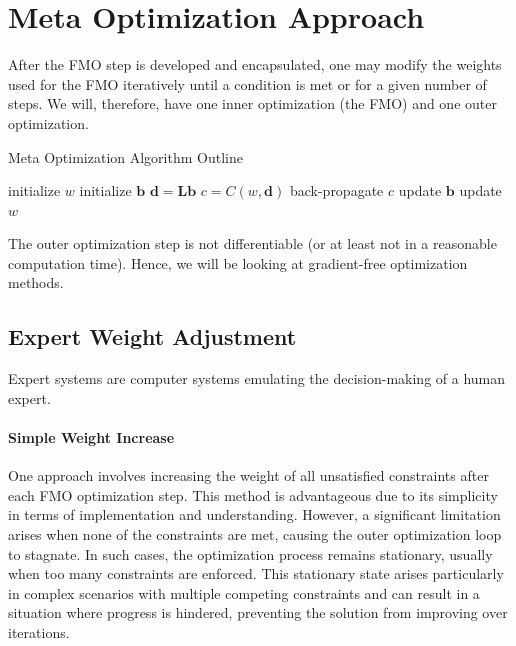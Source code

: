 \section{Meta Optimization Approach}
After the FMO step is developed and encapsulated, one may modify the weights used for the FMO iteratively until a condition is met or for a given number of steps.
We will, therefore, have one inner optimization (the FMO) and one outer optimization.
\begin{center}
	\begin{minipage}{.55\linewidth}
		\begin{algorithm}[H]
			\caption{Meta Optimization Algorithm Outline}
			\label{alg:meta_optim}
			\begin{algorithmic}
				\State initialize $w$
				\Repeat
					\State initialize $\mathbf{b}$ 
					\Repeat
						\State \textcolor{Prune}{ $\mathbf{d} = \textbf{L}\mathbf{b}$  }
						\State \textcolor{Prune}{ $c = C(w, \mathbf{d})$  }
						\State \textcolor{Prune}{ back-propagate $c$ }
						\State \textcolor{Prune}{ update $\mathbf{b}$ }
					 
					\State update $w$
			\end{algorithmic}
		\end{algorithm}
	\end{minipage}
\end{center}
The outer optimization step is not differentiable (or at least not in a reasonable computation time).
Hence, we will be looking at gradient-free optimization methods.

\subsection{Expert Weight Adjustment}
Expert systems are computer systems emulating the decision-making of a human expert.

\paragraph{Simple Weight Increase}
One approach involves increasing the weight of all unsatisfied constraints after each FMO optimization step.
This method is advantageous due to its simplicity in terms of implementation and understanding.
However, a significant limitation arises when none of the constraints are met, causing the outer optimization loop to stagnate.
In such cases, the optimization process remains stationary, usually when too many constraints are enforced.
This stationary state arises particularly in complex scenarios with multiple competing constraints and can result in a situation where progress is hindered, preventing the solution from improving over iterations.

